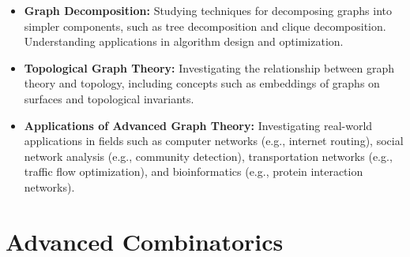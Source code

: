 \documentclass[openany]{book}
\begin{document}
\begin{itemize}
    \item \textbf{Graph Decomposition:} Studying techniques for decomposing graphs into simpler components, such as tree decomposition and clique decomposition. Understanding applications in algorithm design and optimization.
    \item \textbf{Topological Graph Theory:} Investigating the relationship between graph theory and topology, including concepts such as embeddings of graphs on surfaces and topological invariants.
    \item \textbf{Applications of Advanced Graph Theory:} Investigating real-world applications in fields such as computer networks (e.g., internet routing), social network analysis (e.g., community detection), transportation networks (e.g., traffic flow optimization), and bioinformatics (e.g., protein interaction networks).
\end{itemize}
\section{Advanced Combinatorics}
\end{document}
